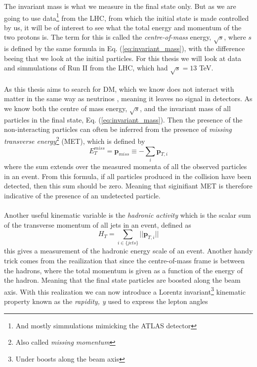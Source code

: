 \documentclass[14pt, a4paper]{book}
\begin{document}
The invariant mass is what we measure in the final state only. But as we are going to use data\footnote{And mostly simmulations mimicking the ATLAS detector} from the LHC, from which the initial state is made controlled by us, 
it will be of interest to see what the total energy and momentum of the two protons is. The term for this is called the \textit{centre-of-mass} energy, $\sqrt s$, where $s$ is defined by the same formula in Eq. (\ref{eq:invariant_mass}), 
with the difference beeing that we look at the initial particles. For this thesis we will look at data and simmulations of Run II from the LHC, which had $\sqrt s = 13$ TeV. \\
\\As this thesis aims to search for DM, which we know does not interact with matter in the same way as neutrinos , meaning it leaves no signal in detectors. 
As we know both the centre of mass energy, $\sqrt s$, and the invariant mass of all particles in the final state, Eq. (\ref{eq:invariant_mass}). Then the presence of the non-interacting particles can often be 
inferred from the presence of \textit{missing transverse energy}\footnote{Also called \textit{missing momentum}} (MET), which is defined by
\begin{equation}\label{eq:MET}
    E_T^{miss} = \mathbf{p}_{miss} \equiv -\sum_i \mathbf{p}_{T,i}
\end{equation}
where the sum extends over the measured momenta of all the observed particles in an event. From this formula, if all particles produced in the collision have been detected, then this sum should be zero. Meaning that 
siginifiant MET is therefore indicative of the presence of an undetected particle. \\
\\Another useful kinematic variable is the \textit{hadronic activity} which is the scalar sum of the transverse momentum of all jets in an event, defined as
\begin{equation}
    H_T = \sum_{i\in\{jets\}} \vert\vert \mathbf{p}_{T,i}\vert\vert
\end{equation}
this gives a measurement of the hadronic energy scale of an event. Another handy trick comes from the reailization that since the centre-of-mass frame is between the hadrons, where the total momentum is given as a function of the energy of the hadron. 
Meaning that the final state particles are boosted along the beam axis. With this realization we can now introduce a Lorentz invariant\footnote{Under boosts along the beam axis} kinematic property known as the \textit{rapidity, y} used to express the lepton angles
\end{document}
